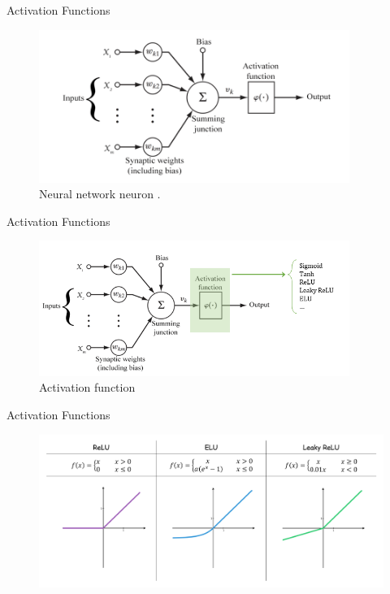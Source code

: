 \documentclass[compress,oilve,t]{beamer}
\begin{document}
\begin{frame}{Activation Functions}
	\begin{figure}[H]
		\centering
		\includegraphics[width=0.9\textwidth]{Figs/nn_neuron.png}
		\caption{Neural network neuron \cite{biological-and-nn-neuron}.}
	\end{figure}
\end{frame}

\begin{frame}{Activation Functions}
	\begin{figure}[H]
		\centering
		\includegraphics[width=0.9\textwidth]{Figs/activation_function_1.png}
		\caption{Activation function}
	\end{figure}
\end{frame}

\begin{frame}{Activation Functions}
	\begin{figure}[H]
		\centering
		\includegraphics[width=1\textwidth]{Figs/section_1/activation_functions_1.PNG}
	\end{figure}
\end{frame}
\end{document}
